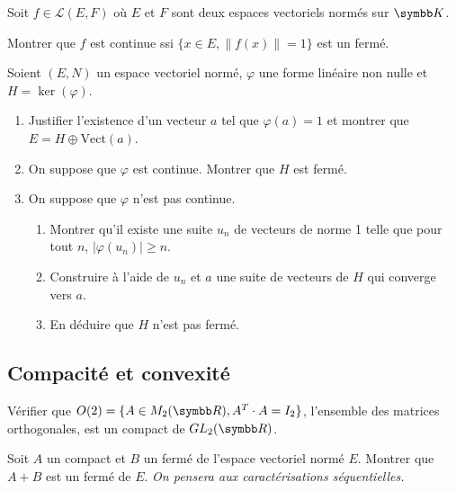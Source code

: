 \begin{exercice}
    Soit $f \in \mathscr L(E,F)$ où $E$ et $F$ sont deux espaces vectoriels normés sur $\K$.

    Montrer que $f$ est continue ssi $\{x \in E, \|f(x)\| = 1\}$ est un fermé.
\end{exercice}

\begin{exercice}
    Soient $(E, N)$ un espace vectoriel normé, $\varphi$ une forme linéaire non nulle et $H = \ker(\varphi)$.
    \begin{enumerate}
        \item Justifier l'existence d'un vecteur $a$ tel que $\varphi(a)=1$ et montrer que $E = H \oplus \text{Vect}(a)$.
        \item On suppose que $\varphi$ est continue. Montrer que $H$ est fermé.
        \item On suppose que $\varphi$ n'est pas continue.
        \begin{enumerate}
            \item Montrer qu'il existe une suite $u_{n}$ de vecteurs de norme 1 telle que pour tout $n$, $|\varphi(u_{n})| \geqslant n$.
            \item Construire à l'aide de $u_{n}$ et $a$ une suite de vecteurs de $H$ qui converge vers $a$.
            \item En déduire que $H$ n'est pas fermé.
        \end{enumerate}
    \end{enumerate}
\end{exercice}

\subsection{Compacité et convexité}

\begin{exercice}
    Vérifier que $O(2) = \{A \in M_2 (\R), A^T \cdot A = I_2\}$, 
    l'ensemble des matrices orthogonales, est un compact de $GL_{2}(\R)$.
\end{exercice}

\begin{exercice}
    Soit $A$ un compact et $B$ un fermé de l'espace vectoriel normé $E$.
    Montrer que $A+B$ est un fermé de $E$.
    \textit{On pensera aux caractérisations séquentielles.}
\end{exercice}

